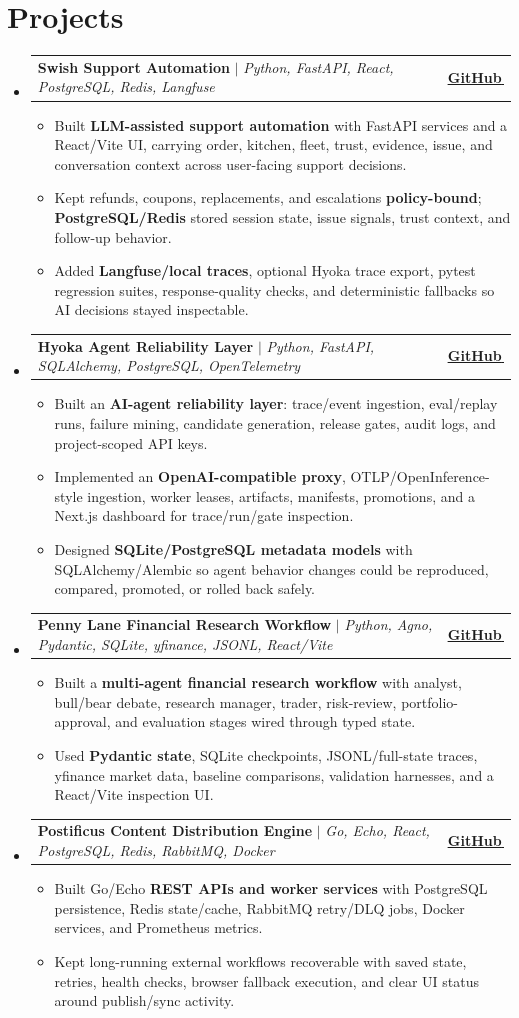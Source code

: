 \documentclass[letterpaper,11pt]{article}
\makeatletter
\newcommand{\bodyhref}[2]{\href{#1}{\underline{#2}\,\faExternalLink*}}
\newcommand{\resumeItem}[1]{\item{\fontsize{8.85pt}{9.25pt}\selectfont #1\vspace{-0.5pt}}}
\newcommand{\resumeProjectHeading}[2]{
    \item
    \begin{tabular*}{1.0\textwidth}{l@{\extracolsep{\fill}}r}
      \small#1 & \textbf{\small #2}\\
    \end{tabular*}\vspace{-4pt}
}
\newcommand{\resumeSubHeadingListStart}{\begin{itemize}[leftmargin=0.0in, label={}, itemsep=0.6pt, topsep=0pt, parsep=0pt, partopsep=0pt]}
\newcommand{\resumeSubHeadingListEnd}{\end{itemize}}
\newcommand{\resumeItemListStart}{\begin{itemize}[leftmargin=0.16in,itemsep=0.35pt,topsep=0.55pt,parsep=0pt,partopsep=0pt]}
\newcommand{\resumeItemListEnd}{\end{itemize}\vspace{-3pt}}
\makeatother
\begin{document}
\section{Projects}
\resumeSubHeadingListStart
\resumeProjectHeading
{\textbf{Swish Support Automation} $|$ \emph{Python, FastAPI, React, PostgreSQL, Redis, Langfuse}}{\bodyhref{https://github.com/unichronic/swishagent}{GitHub}}
\resumeItemListStart
\resumeItem{Built \textbf{LLM-assisted support automation} with FastAPI services and a React/Vite UI, carrying order, kitchen, fleet, trust, evidence, issue, and conversation context across user-facing support decisions.}
\resumeItem{Kept refunds, coupons, replacements, and escalations \textbf{policy-bound}; \textbf{PostgreSQL/Redis} stored session state, issue signals, trust context, and follow-up behavior.}
\resumeItem{Added \textbf{Langfuse/local traces}, optional Hyoka trace export, pytest regression suites, response-quality checks, and deterministic fallbacks so AI decisions stayed inspectable.}
\resumeItemListEnd
\resumeProjectHeading
{\textbf{Hyoka Agent Reliability Layer} $|$ \emph{Python, FastAPI, SQLAlchemy, PostgreSQL, OpenTelemetry}}{\bodyhref{https://github.com/unichronic/hyoka}{GitHub}}
\resumeItemListStart
\resumeItem{Built an \textbf{AI-agent reliability layer}: trace/event ingestion, eval/replay runs, failure mining, candidate generation, release gates, audit logs, and project-scoped API keys.}
\resumeItem{Implemented an \textbf{OpenAI-compatible proxy}, OTLP/OpenInference-style ingestion, worker leases, artifacts, manifests, promotions, and a Next.js dashboard for trace/run/gate inspection.}
\resumeItem{Designed \textbf{SQLite/PostgreSQL metadata models} with SQLAlchemy/Alembic so agent behavior changes could be reproduced, compared, promoted, or rolled back safely.}
\resumeItemListEnd
\resumeProjectHeading
{\textbf{Penny Lane Financial Research Workflow} $|$ \emph{Python, Agno, Pydantic, SQLite, yfinance, JSONL, React/Vite}}{\bodyhref{https://github.com/unichronic/pennylane}{GitHub}}
\resumeItemListStart
\resumeItem{Built a \textbf{multi-agent financial research workflow} with analyst, bull/bear debate, research manager, trader, risk-review, portfolio-approval, and evaluation stages wired through typed state.}
\resumeItem{Used \textbf{Pydantic state}, SQLite checkpoints, JSONL/full-state traces, yfinance market data, baseline comparisons, validation harnesses, and a React/Vite inspection UI.}
\resumeItemListEnd
\resumeProjectHeading
{\textbf{Postificus Content Distribution Engine} $|$ \emph{Go, Echo, React, PostgreSQL, Redis, RabbitMQ, Docker}}{\bodyhref{https://github.com/unichronic/postificus}{GitHub}}
\resumeItemListStart
\resumeItem{Built Go/Echo \textbf{REST APIs and worker services} with PostgreSQL persistence, Redis state/cache, RabbitMQ retry/DLQ jobs, Docker services, and Prometheus metrics.}
\resumeItem{Kept long-running external workflows recoverable with saved state, retries, health checks, browser fallback execution, and clear UI status around publish/sync activity.}
\resumeItemListEnd
\resumeSubHeadingListEnd
\end{document}
